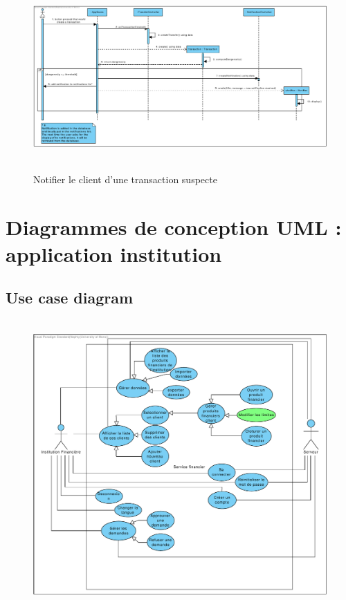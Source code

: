 \documentclass[]{report}
\begin{document}


\newpage

\begin{figure}[h!]
\hbox{
	\centering\includegraphics[width=\linewidth]{img/Sequence 9 - Extension 6.pdf}
}
\caption{Notifier le client d'une transaction suspecte}
\end{figure}
	

	

\newpage




\section{Diagrammes de conception UML : application institution}




\subsection{Use case diagram}

\begin{figure}[h!]
\hbox{
	\centering\includegraphics[width=\linewidth]{img/Use Case Institution - Extension 6.pdf}
}
\end{figure}
\end{document}
